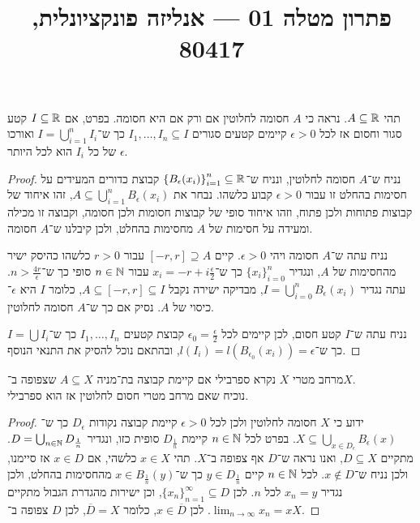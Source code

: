 
\title{פתרון מטלה 01 --- אנליזה פונקציונלית, 80417}


\maketitle
\maketitleprint{}

\question{}
תהי $A \subseteq \mathbb{R}$.
נראה כי $A$ חסומה לחלוטין אם ורק אם היא חסומה.
בפרט, אם $I \subseteq \mathbb{R}$ קטע סגור וחסום אז לכל $\epsilon > 0$  קיימים קטעים סגורים $I_1, \dots, I_n \subseteq I$ כך ש־$I = \bigcup_{i = 1}^n I_i$ ואורכו של כל $I_i$ הוא לכל היותר $\epsilon$.
\begin{proof}
	נניח ש־$A$ חסומה לחלוטין, ונניח ש־${\{ B_\epsilon(x_i) \}}_{i = 1}^n \subseteq \mathbb{R}$ קבוצת כדורים המעידים על חסימות בהחלט זו עבור $\epsilon > 0$ קבוע כלשהו.
	נבחר את $A \subseteq \bigcup_{i = 1}^n B_\epsilon(x_i)$, זהו איחוד של קבוצות פתוחות ולכן פתוח, וזהו איחוד סופי של קבוצות חסומות ולכן חסומה, וקבוצה זו מכילה ומעידה על חסימות של $A$ מחסימות בהחלט, ולכן קיבלנו ש־$A$ חסומה.

	נניח עתה ש־$A$ חסומה ויהי $\epsilon > 0$.
	קיים $[-r, r] \supseteq A$ עבור $r > 0$ כלשהו כהיסק ישיר מהחסימות של $A$, ונגדיר ${\{ x_i \}}_{i = 0}^n$ כך ש־$x_i = -r + i \frac{\epsilon}{2}$ עבור $n \in \mathbb{N}$ סופי כך ש־$n > \frac{4r}{\epsilon}$.
	עתה נגדיר $I = \bigcup_{i = 0}^n B_\epsilon(x_i)$, מבדיקה ישירה נקבל $A \subseteq [-r, r] \subseteq I$, כלומר $I$ היא $\epsilon$־כיסוי של $A$.
	נסיק אם כך ש־$A$ חסומה לחלוטין.

	נניח עתה ש־$I$ קטע חסום, לכן קיימים לכל $\epsilon_0 = \frac{\epsilon}{2}$ קבוצת קטעים $I_1, \dots, I_n$ כך ש־$I = \bigcup I_i$ כך ש־$l(I_i) = l(B_{\epsilon_0}(x_i)) = \epsilon$, ובהתאם נוכל להסיק את התנאי הנוסף.
\end{proof}

\question{}
מרחב מטרי $X$ נקרא ספרבילי אם קיימת קבוצה בת־מניה $A \subseteq X$ שצפופה ב־$X$. \\
נוכיח שאם מרחב מטרי חסום לחלוטין אז הוא ספרבילי.
\begin{proof}
	ידוע כי $X$ חסומה לחלוטין ולכן לכל $\epsilon > 0$ קיימת קבוצה נקודות $D_\epsilon$ כך ש־$X \subseteq \bigcup_{x \in D_\epsilon} B_\epsilon(x)$.
	בפרט לכל $n \in \mathbb{N}$ קיימת $D_{\frac{1}{n}}$ סופית כזו, ונגדיר $D = \bigcup_{n \in \mathbb{N}} D_{\frac{1}{n}}$.
	מתקיים $D \subseteq X$, ואנו נראה ש־$D$ אף צפופה ב־$X$.
	תהי $x \in X$ כלשהי, אם $x \in D$ אז סיימנו, ולכן נניח ש־$x \notin D$.
	לכל $n \in \mathbb{N}$ קיים $y \in D_{\frac{1}{n}}$ כך ש־$x \in B_{\frac{1}{n}}(y)$ מהחסימות בהחלט, ולכן נגדיר $x_n = y$ לכל $n$.
	לכן ${\{ x_n \}}_{n = 1}^\infty \subseteq D$, וכן ישירות מהגדרת הגבול מתקיים $\lim_{n \to \infty} x_n = x$.
	לכן $x \in \overline{D}$, כלומר $\overline{D} = X$, לכן $D$ צפופה ב־$X$.
\end{proof}


